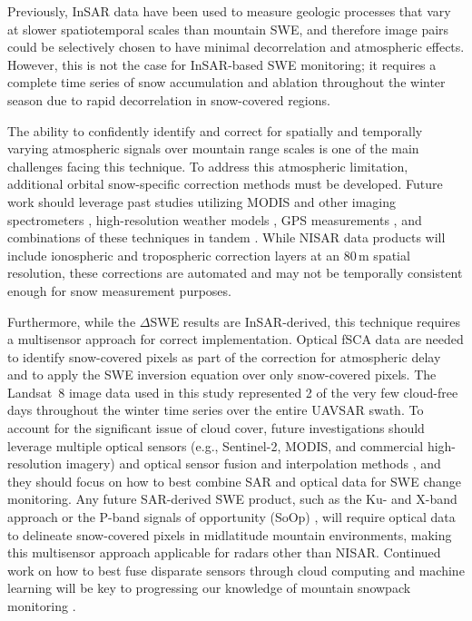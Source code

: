 Previously, InSAR data have been used to measure geologic processes that vary at slower spatiotemporal scales than mountain SWE, and therefore image pairs could be selectively chosen to have minimal decorrelation and atmospheric effects. However, this is not the case for InSAR-based SWE monitoring; it requires a complete time series of snow accumulation and ablation throughout the winter season due to rapid decorrelation in snow-covered regions.

The ability to confidently identify and correct for spatially and temporally varying atmospheric signals over mountain range scales is one of the main challenges facing this technique. To address this atmospheric limitation, additional orbital snow-specific correction methods must be developed. Future work should leverage past studies utilizing MODIS and other imaging spectrometers \citep{liAdvancedInSARAtmospheric2009}, high-resolution weather models \citep{liuValueHighresolutionWeather2009}, GPS measurements \citep{liInterferometricSyntheticAperture2006}, and combinations of these techniques in tandem \citep{bekaertStatisticalComparisonInSAR2015}. While NISAR data products will include ionospheric and tropospheric correction layers at an 80\,m spatial resolution, these corrections are automated and may not be temporally consistent enough for snow measurement purposes.

Furthermore, while the $\Delta$SWE results are InSAR-derived, this technique requires a multisensor approach for correct implementation. Optical fSCA data are needed to identify snow-covered pixels as part of the correction for atmospheric delay and to apply the SWE inversion equation over only snow-covered pixels. The Landsat~8 image data used in this study represented 2 of the very few cloud-free days throughout the winter time series over the entire UAVSAR swath. To account for the significant issue of cloud cover, future investigations should leverage multiple optical sensors (e.g., Sentinel-2, MODIS, and commercial high-resolution imagery) and optical sensor fusion and interpolation methods \citep{rittgerMultisensorFusionUsing2021,dozierTimeSpaceContinuity2008}, and they should focus on how to best combine SAR and optical data for SWE change monitoring. Any future SAR-derived SWE product, such as the Ku- and X-band approach \citep{tsangReviewArticleGlobal2022} or the P-band signals of opportunity (SoOp) \citep{yuehSatelliteSyntheticAperture2021}, will require optical data to delineate snow-covered pixels in midlatitude mountain environments, making this multisensor approach applicable for radars other than NISAR. Continued work on how to best fuse disparate sensors through cloud computing and machine learning will be key to progressing our knowledge of mountain snowpack monitoring  \citep{durandAchievingBreakthroughsGlobal2021}.

